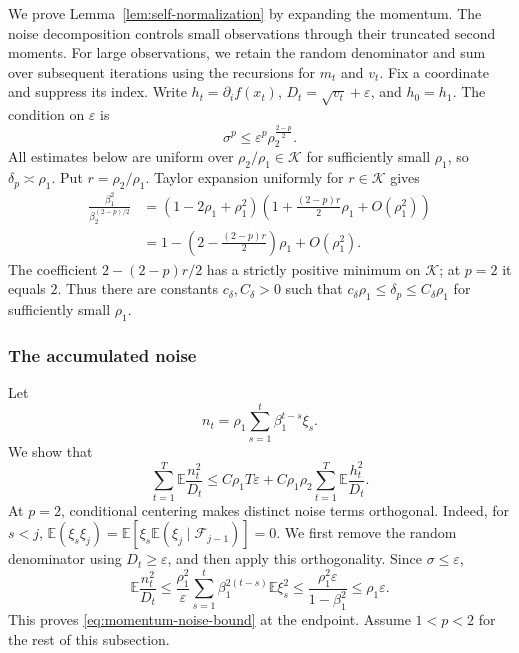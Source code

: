 \documentclass[11pt,letterpaper]{article}
\theoremstyle{definition}
\newcommand{\E}{\mathbb E}
\newcommand{\F}{\mathcal F}
\newcommand{\eps}{\varepsilon}
\begin{document}
We prove Lemma~\ref{lem:self-normalization} by expanding the momentum.
The noise decomposition controls small observations through their truncated
second moments. For large observations, we retain the random denominator and
sum over subsequent iterations using the recursions for $m_t$ and $v_t$.
Fix a coordinate and suppress its index. Write $h_t=\partial_i f(x_t)$,
$D_t=\sqrt{v_t}+\eps$, and $h_0=h_1$. The condition on $\eps$ is
\begin{equation}
\sigma^p\le\eps^p\rho_2^{\frac{2-p}{2}}.
\label{eq:tracking-floor-condition}
\end{equation}
All estimates below are uniform over $\rho_2/\rho_1\in\mathcal K$ for
sufficiently small $\rho_1$, so $\delta_p\asymp\rho_1$.
Put $r=\rho_2/\rho_1$. Taylor expansion
uniformly for $r\in\mathcal K$ gives
\begin{align*}
\frac{\beta_1^2}{\beta_2^{(2-p)/2}}
&=(1-2\rho_1+\rho_1^2)
\left(1+\frac{(2-p)r}{2}\rho_1+O(\rho_1^2)\right)\\
&=1-\left(2-\frac{(2-p)r}{2}\right)\rho_1+O(\rho_1^2).
\end{align*}
The coefficient $2-(2-p)r/2$ has a strictly positive minimum on $\mathcal K$;
at $p=2$ it equals $2$. Thus there are constants $c_\delta,C_\delta>0$
such that $c_\delta\rho_1\le\delta_p\le C_\delta\rho_1$ for sufficiently small $\rho_1$.

\subsubsection{The accumulated noise}

Let
\[
n_t=\rho_1\sum_{s=1}^t\beta_1^{t-s}\xi_s.
\]
We show that
\begin{equation}
\sum_{t=1}^T\E\frac{n_t^2}{D_t}
\le C\rho_1T\eps
+C\rho_1\rho_2\sum_{t=1}^T\E\frac{h_t^2}{D_t}.
\label{eq:momentum-noise-bound}
\end{equation}
At $p=2$, conditional centering makes distinct noise terms orthogonal.
Indeed, for $s<j$,
$\E(\xi_s\xi_j)=\E[\xi_s\E(\xi_j\mid\F_{j-1})]=0$.
We first remove the random denominator using $D_t\ge\eps$, and then
apply this orthogonality. Since $\sigma\le\eps$,
\[
\E\frac{n_t^2}{D_t}
\le\frac{\rho_1^2}{\eps}
\sum_{s=1}^t\beta_1^{2(t-s)}\E\xi_s^2
\le\frac{\rho_1^2\eps}{1-\beta_1^2}
\le\rho_1\eps.
\]
This proves \eqref{eq:momentum-noise-bound} at the endpoint. Assume
$1<p<2$ for the rest of this subsection.
\end{document}
